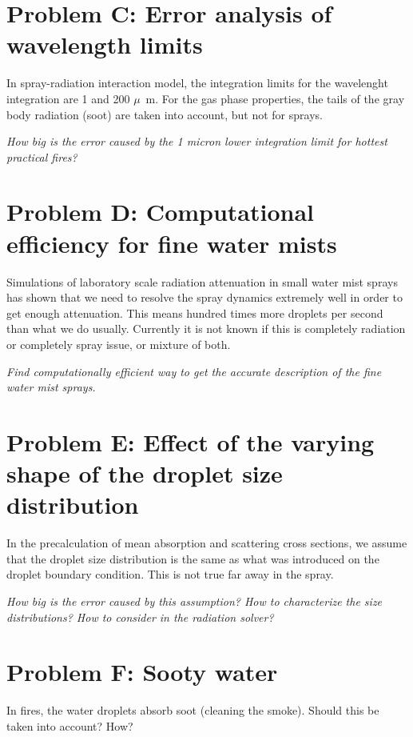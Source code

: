 \documentclass[12pt]{article}
\begin{document}
\section{Problem C: Error analysis of wavelength limits}

In spray-radiation interaction model, the integration limits for the wavelenght integration are 1 and 200 $\mu$~m. For the gas phase properties,
the tails of the gray body radiation (soot) are taken into account, but not for sprays. \newline

{\em How big is the error caused by the 1 micron lower integration limit for hottest practical fires?}

\section{Problem D: Computational efficiency for fine water mists}

Simulations of laboratory scale radiation attenuation in small water mist sprays has shown that we need to resolve the spray dynamics extremely 
well in order to get enough attenuation. This means hundred times more droplets per second than what we do usually. 
Currently it is not known if this is completely radiation or completely spray issue, or mixture of both. 
\newline

{\em Find computationally efficient way to get the accurate description of the fine water mist sprays.}

\section{Problem E: Effect of the varying shape of the droplet size distribution}

In the precalculation of mean absorption and scattering cross sections, we assume that the droplet size distribution is the same as what
was introduced on the droplet boundary condition. This is not true far away in the spray. 
\newline

{\em How big is the error caused by this assumption? How to characterize the size distributions? How to consider in the radiation solver?}

\section{Problem F: Sooty water}

In fires, the water droplets absorb soot (cleaning the smoke). Should this be taken into account? How?
\end{document}

